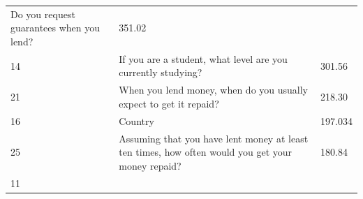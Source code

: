 \begin{longtable}[]{@{}lll@{}}
\begin{minipage}[t]{0.77\columnwidth}
Do you request guarantees when you lend?\strut
\end{minipage} & \begin{minipage}[t]{0.09\columnwidth}\raggedright
351.02\strut
\end{minipage}\tabularnewline
\begin{minipage}[t]{0.05\columnwidth}\raggedright
14\strut
\end{minipage} & \begin{minipage}[t]{0.77\columnwidth}\raggedright
If you are a student, what level are you currently studying?\strut
\end{minipage} & \begin{minipage}[t]{0.09\columnwidth}\raggedright
301.56\strut
\end{minipage}\tabularnewline
\begin{minipage}[t]{0.05\columnwidth}\raggedright
21\strut
\end{minipage} & \begin{minipage}[t]{0.77\columnwidth}\raggedright
When you lend money, when do you usually expect to get it repaid?\strut
\end{minipage} & \begin{minipage}[t]{0.09\columnwidth}\raggedright
218.30\strut
\end{minipage}\tabularnewline
\begin{minipage}[t]{0.05\columnwidth}\raggedright
16\strut
\end{minipage} & \begin{minipage}[t]{0.77\columnwidth}\raggedright
Country\strut
\end{minipage} & \begin{minipage}[t]{0.09\columnwidth}\raggedright
197.034\strut
\end{minipage}\tabularnewline
\begin{minipage}[t]{0.05\columnwidth}\raggedright
25\strut
\end{minipage} & \begin{minipage}[t]{0.77\columnwidth}\raggedright
Assuming that you have lent money at least ten times, how often would
you get your money repaid?\strut
\end{minipage} & \begin{minipage}[t]{0.09\columnwidth}\raggedright
180.84\strut
\end{minipage}\tabularnewline
\begin{minipage}[t]{0.05\columnwidth}\raggedright
11\strut
\end{minipage} & \begin{minipage}[t]{0.77\columnwidth}\raggedright

\end{minipage}
\end{longtable}
